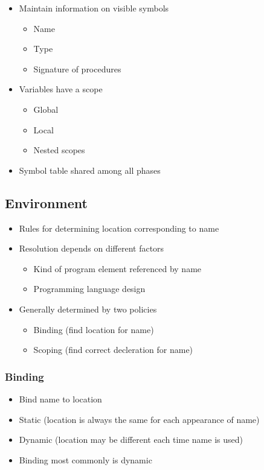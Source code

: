 \documentclass{scrartcl}
\begin{document}
\begin{itemize}
	\item Maintain information on visible symbols
	\begin{itemize}
		\item Name
		\item Type
		\item Signature of procedures
	\end{itemize}
	\item Variables have a scope
	\begin{itemize}
		\item Global
		\item Local
		\item Nested scopes
	\end{itemize}
	\item Symbol table shared among all phases
\end{itemize}

\subsection{Environment}

\begin{itemize}
	\item Rules for determining location corresponding to name
	\item Resolution depends on different factors
	\begin{itemize}
		\item Kind of program element referenced by name
		\item Programming language design
	\end{itemize}
	\item Generally determined by two policies
	\begin{itemize}
		\item Binding (find location for name)
		\item Scoping (find correct decleration for name)
	\end{itemize}
\end{itemize}

\subsubsection{Binding}

\begin{itemize}
	\item Bind name to location
	\item Static (location is always the same for each appearance of name)
	\item Dynamic (location may be different each time name is used)
	\item Binding most commonly is dynamic
\end{itemize}
\end{document}
